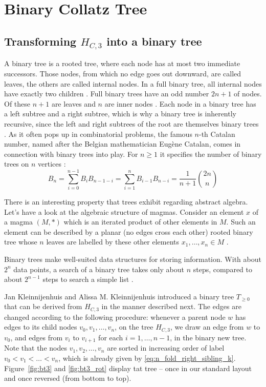 \chapter{Binary Collatz Tree}
\label{ch:binary_tree}

\section{\texorpdfstring{Transforming $H_{C,3}$ into a binary tree}{Transforming HC3 into a binary tree}}
A binary tree is a rooted tree, where each node has at most two immediate successors. Those nodes, from which no edge goes out downward, are called leaves, the others are called internal nodes. In a full binary tree, all internal nodes have exactly two children \cite[p.~102]{Ref_Higham_2015}. Full binary trees have an odd number $2n+1$ of nodes. Of these $n+1$ are leaves and $n$ are inner nodes \cite[p.~134]{Ref_Kersting_Wakolbinger_2008}. Each node in a binary tree has a left subtree and a right subtree, which is why a binary tree is inherently recursive, since the left and right subtrees of the root are themselves binary trees \cite[p.~246-247]{Ref_Mazur_2010}. As it often pops up in combinatorial problems, the famous $n$-th Catalan number, named after the Belgian mathematician Eugène Catalan, comes in connection with binary trees into play. For $n\ge1$ it specifies the number of binary trees on $n$ vertices \cite[p.~247]{Ref_Mazur_2010}:
\[
B_n=\sum_{i=0}^{n-1}B_iB_{n-1-i}=\sum_{i=1}^{n}B_{i-1}B_{n-i}=\frac{1}{n+1}\binom{2n}{n}
\]

There is an interesting property that trees exhibit regarding abstract algebra. Let's have a look at the algebraic structure of magmas. Consider an element $x$ of a magma $(M,*)$ which is an iterated product of other elements in $M$. Such an element can be described by a planar (no edges cross each other) rooted binary tree whose $n$ leaves are labelled by these other elements $x_1,\ldots,x_n\in M$ \cite[p.~96]{Ref_Kalka_2016}.

Binary trees make well-suited data structures for storing information. With about $2^n$ data points, a search of a binary tree takes only about $n$ steps, compared to about $2^{n-1}$ steps to search a
simple list \cite[p.~84]{Ref_Benjamin_2009}.

Jan Kleinnijenhuis and Alissa M. Kleinnijenhuis \cite{Ref_Kleinnijenhuis} introduced a binary tree $T_{\ge0}$ that can be derived from $H_{C,3}$ in the manner described next. The edges are changed according to the following procedure: whenever a parent node $w$ has edges to its child nodes $v_0,v_1,\ldots,v_n$, on the tree $H_{C,3}$, we draw an edge from $w$ to $v_0$, and edges from $v_i$ to $v_{i+1}$ for each $i=1,\ldots,n-1$, in the binary new tree. Note that the nodes $v_1,v_2,\ldots,v_n$ are sorted in increasing order of label $v_0<v_1<\ldots<v_n$, which is already given by \ref{eq:n_fold_right_sibling_k}. Figure~\ref{fig:bt3} and \ref{fig:bt3_rot} display tat tree -- once in our standard layout and once reversed (from bottom to top).

